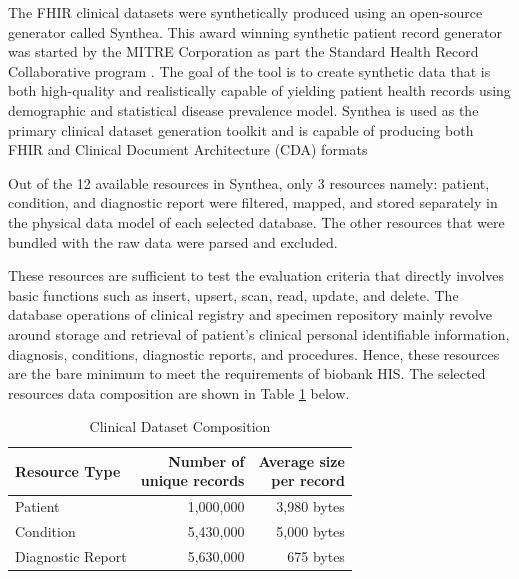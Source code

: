 \documentclass[5p]{elsarticle}
\begin{document}
The FHIR clinical datasets were synthetically produced using an open-source generator called Synthea. 
This award winning \cite{HealthDataManagement2017} synthetic patient record generator was started by the MITRE Corporation as
part the Standard Health Record Collaborative program \cite{J.Walonoski2018230}. 
The goal of the tool is to create synthetic data that is both high-quality and realistically capable of yielding patient health records using demographic and statistical disease prevalence model. 
Synthea is used as the primary clinical dataset generation toolkit \cite{J.C.M2016899} and is capable of producing both FHIR and Clinical Document Architecture (CDA) formats \cite{J.Walonoski2018230}


Out of the 12 available resources in Synthea, only 3 resources namely: patient, condition, and diagnostic report were filtered, mapped,
and stored separately in the physical data model of each selected database. 
The other resources that were bundled with the raw data were parsed and excluded. 

These resources are sufficient to test the evaluation criteria that directly involves basic functions such as insert, upsert, scan, read, update, and delete. 
The database operations of clinical registry and specimen repository mainly revolve around storage and retrieval of patient’s clinical personal identifiable information,
diagnosis, conditions, diagnostic reports, and procedures. Hence, these resources are the bare minimum to meet the requirements of biobank HIS.
The selected resources data composition are shown in Table \ref{table.dataset.composition} below.


\begin{table}[!hbp]
    \centering
    \caption[l]{Clinical Dataset Composition}
     \label{table.dataset.composition}
        \begin{tabular}{lrr}
        \toprule
        Resource Type & \makecell[c]{Number of \\unique records}& \makecell[c]{Average size \\per record} \\
        \hline
        Patient           & 1,000,000 & 3,980 bytes \\
        Condition         & 5,430,000 & 5,000 bytes \\
        Diagnostic Report & 5,630,000 & 675 bytes \\
        \hline
    \end{tabular}
\end{table}
\end{document}
